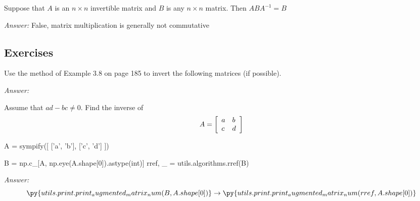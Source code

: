 \documentclass[letterpaper]{article}
\newcommand{\ans}{\textit{Answer: }}
\newenvironment{question}[2][Question]{\begin{trivlist}
\item[\hskip \labelsep {\bfseries #1}\hskip \labelsep {\bfseries #2.}]}{\end{trivlist}}
\begin{document}
\begin{question}{3.30}
  Suppose that $A$ is an $n \times n$ invertible matrix and $B$ is any $n \times n$ matrix. Then
  $A B A ^ { - 1 } = B$

  \ans False, matrix multiplication is generally not commutative 
\end{question}

\subsection{Exercises}

\begin{question}{3.64}
  Use the method of Example 3.8 on page 185 to invert the following matrices
  (if possible).


  \ans
\end{question}

\begin{question}{3.71}
  Assume that $a d - b c \neq 0 .$ Find the inverse of
  $$A = \left[ \begin{array} { l l } { a } & { b } \\ { c } & { d } \end{array} \right]$$
  
  \begin{pycode}
A = sympify([
  ['a', 'b'],
  ['c', 'd']
])

B = np.c_[A, np.eye(A.shape[0]).astype(int)]
rref, _ = utils.algorithms.rref(B)
  \end{pycode}

  \ans
  $$
  \py{utils.print.print_augmented_matrix_num(B, A.shape[0])}
  \rightarrow
  \py{utils.print.print_augmented_matrix_num(rref, A.shape[0])}
  $$
\end{question}
\end{document}
